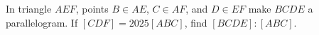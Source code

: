 In triangle $AEF$, points $B\in AE$, $C\in AF$, and $D\in EF$ make $BCDE$ a parallelogram. If $[CDF]=2025[ABC]$, find $[BCDE]:[ABC]$.
